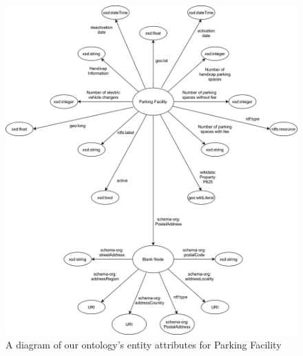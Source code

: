 \begin{figure}[H]
	\centering
	\includegraphics[scale=0.13]{figures/parking-facility-attributes.png}
	\caption{A diagram of our ontology's entity attributes for Parking Facility} 
\end{figure}


